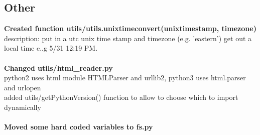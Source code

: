     \subsection{Other}
         \textbf{Created function utils/utils.unixtimeconvert(unixtimestamp, timezone)}\\
        description: put in a utc unix time stamp and timezone (e.g. 'eastern') get out a local time e..g 5/31 12:19 PM.\\
        ~\\
        \textbf{Changed utils/html\_reader.py}\\
        python2 uses html module HTMLParser and urllib2, python3 uses html.parser and urlopen\\
        added utils/getPythonVersion() function to allow to choose which to import dynamically\\
        ~\\
        \textbf{Moved some hard coded variables to fs.py}